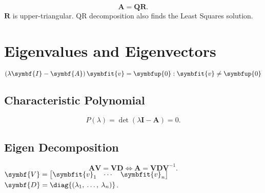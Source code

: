 \documentclass{article}
\begin{document}
\begin{multicols*}{3}
    \begin{equation*}
        \symbf{A} = \symbf{Q} \symbf{R}.
    \end{equation*}
    \(\symbf{R}\) is upper-triangular. QR decomposition also finds the Least Squares solution.
    \section{Eigenvalues and Eigenvectors}
    \begin{equation*}
        \left( \lambda \symbf{I} - \symbf{A} \right) \symbfit{v} = \symbfup{0} : \symbfit{v} \neq \symbfup{0}
    \end{equation*}
    \subsection{Characteristic Polynomial}
    \begin{equation*}
        P\left( \lambda \right) = \det{\left( \lambda \symbf{I} - \symbf{A} \right)} = 0.
    \end{equation*}
    \subsection{Eigen Decomposition}
    \begin{equation*}
        \symbf{A} \symbf{V} = \symbf{V} \symbf{D}                 
        \iff 
        \symbf{A} = \symbf{V} \symbf{D} \symbf{V}^{-1}.
    \end{equation*}
    \(\symbf{V} = \begin{bmatrix}
        \symbfit{v}_1 & \cdots & \symbfit{v}_n
    \end{bmatrix}\) \(\symbf{D} = \diag{\left( \lambda_1,\: \dots,\: \lambda_n \right)}\).

\end{multicols*}
\end{document}
